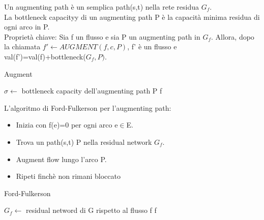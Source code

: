\documentclass{article}
\begin{document}
Un augmenting path è un semplica path(s,t) nella rete residua $G_f$.\\
La bottleneck capacityy di un augmenting path P è la capacità minima residua di ogni arco in P.\\
Proprietà chiave: Sia f un flusso e sia P un augmenting path in $G_f$. Allora, dopo la chiamata $f'\leftarrow AUGMENT(f,c,P)$, f' è un flusso e val(f')=val(f)+bottleneck($G_f,P)$.
\begin{center}
\begin{algorithm}
\caption{Augment}
$\sigma\leftarrow$ bottleneck capacity dell'augmenting path P\;
\Return f\;
\end{algorithm}
\end{center}
L'algoritmo di Ford-Fulkerson per l'augmenting path:\\
\begin{itemize}
    \item Inizia con f(e)=0 per ogni arco e$\in$E.
    \item Trova un path(s,t) P nella residual network $G_f$.
    \item Augment flow lungo l'arco P.
    \item Ripeti finchè non rimani bloccato
\end{itemize}
\newpage
\begin{center}
\begin{algorithm}
\caption{Ford-Fulkerson}
$G_f \leftarrow$ residual netword di G rispetto al flusso f\;
\Return f\;
\end{algorithm}
\end{center}
\end{document}
